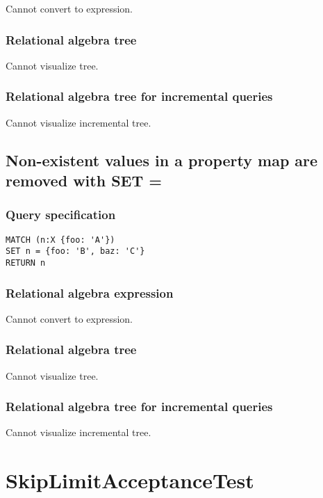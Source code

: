 Cannot convert to expression.

\subsubsection*{Relational algebra tree}

Cannot visualize tree.

\subsubsection*{Relational algebra tree for incremental queries}

Cannot visualize incremental tree.

\subsection{Non-existent values in a property map are removed with SET =}

\subsubsection*{Query specification}

\begin{lstlisting}
MATCH (n:X {foo: 'A'})
SET n = {foo: 'B', baz: 'C'}
RETURN n
\end{lstlisting}

\subsubsection*{Relational algebra expression}

Cannot convert to expression.

\subsubsection*{Relational algebra tree}

Cannot visualize tree.

\subsubsection*{Relational algebra tree for incremental queries}

Cannot visualize incremental tree.

\section{SkipLimitAcceptanceTest}

